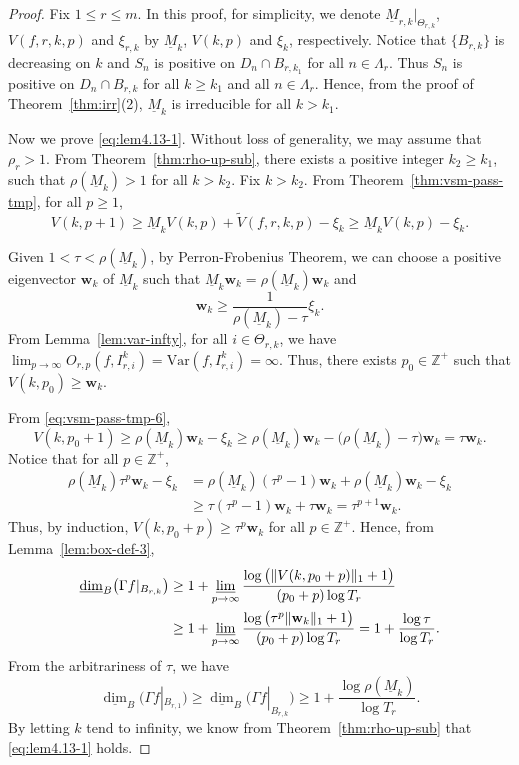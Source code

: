\documentclass[11pt]{amsart}
\theoremstyle{definition}
\theoremstyle{remark}
\numberwithin{equation}{section}
\newcommand{\bfw}{{\mathbf w}}
\newcommand{\lowM}{{\underline{M}}}
\newcommand{\uprho}{{{\rho}}}
\newcommand{\Var}{\mathrm{Var}}
\def\lowdimB{\underline{\dim}_B}
\begin{document}
\begin{proof}
	
	Fix $ 1 \leq r \leq m$.
	In this proof, for simplicity, we denote $\lowM_{r,k}|_{\Theta_{r,k}}$, $V(f,r,k,p)$ and $\xi_{{r,k}}$ by $\lowM_{k}$, $V(k,p)$ and $\xi_{k}$, respectively. 
	Notice that $\{B_{r,k}\}$ is decreasing on $k$ and $S_n$ is positive on $D_n \cap B_{r,k_1}$ for all $n\in \Lambda_r$. Thus $S_n$ is positive on $D_n \cap B_{r,k}$ for all $k\geq k_1$ and all $n\in \Lambda_r$. Hence, from the proof of Theorem~\ref{thm:irr}(2), $\lowM_{k}$ is irreducible for all $k > k_1$. 
	
	Now we prove \eqref{eq:lem4.13-1}. Without loss of generality, we may assume that $\uprho_r>1$. From Theorem~\ref{thm:rho-up-sub}, there exists a positive integer $k_2\geq k_1$, such that $\rho(\lowM_k)>1$ for all $k>k_2$. Fix $k >k_2$. 
	From Theorem~\ref{thm:vsm-pass-tmp}, for all $p\geq 1$,
	\begin{equation}\label{eq:vsm-pass-tmp-6}
		V(k,p+1) \geq \lowM_{k}V(k,p) + \widetilde{V}(f,r,k,p) -\xi_{k}\geq \lowM_{k}V(k,p) -\xi_{k}.
	\end{equation}
	
	
	Given $1 <\tau <\rho(\lowM_k)$,
	by Perron-Frobenius Theorem, we can choose a positive eigenvector $\bfw_{k}$ of $\lowM_{k}$ such that $ \lowM_{k} \bfw_{k}=\rho(\lowM_{k})\bfw_{k}$ and
	$$
	\bfw_{k} \geq \frac{1}{\rho(\lowM_{k})-\tau}\xi_{k}. 
	$$
	From Lemma~\ref{lem:var-infty}, for all $i \in \Theta_{r,k}$, we have $\lim_{p \to \infty}O_{r,p}(f,I_{r,i}^k)=\Var(f,I_{r,i}^k)=\infty$.
	Thus, there exists $p_0\in \mathbb{Z}^+$ such that $V(k, p_0) \geq \bfw_{k}$.
	
	
	From \eqref{eq:vsm-pass-tmp-6}, 
	$$
	V(k, p_0+1)  \geq \rho(\lowM_{k})  \bfw_{k}-\xi_{k}
	\geq \rho(\lowM_{k})  \bfw_{k}-\big(\rho(\lowM_{k})-\tau\big)\bfw_{k} =\tau \bfw_{k}.
	$$
	Notice that for all $p \in \mathbb{Z}^+$,
	\begin{align*}
		\rho(\lowM_{k}) \tau^p \bfw_{k} -\xi_{k} &=\rho(\lowM_{k})(\tau^p-1)\bfw_{k} +\rho(\lowM_{k})\bfw_{k}-\xi_{k} \\
		&\geq \tau (\tau^p-1) \bfw_{k} +\tau \bfw_{k}=\tau^{p+1} \bfw_{k}.
	\end{align*}
	Thus, by induction, $V(k, p_0+p) \geq \tau^p \bfw_k$ for all $p \in \mathbb{Z}^+ $. Hence, from Lemma~\ref{lem:box-def-3}, 
	\begin{align*}
		\lowdimB \big( \Gamma f|_{B_{r,k}}\big) 
		&\geq 1+ \varliminf_{p \to \infty} \frac{\log \big(\lVert V(k,p_0+p) \rVert_1 +1\big)}{(p_{0}+p) \log T_r } \\
		&\geq 1+\varliminf_{p \to \infty} \frac{\log\big(\tau^p \lVert \bfw_{k} \rVert_1 +1\big)}{(p_{0}+p)\log T_r } 
		= 1+ \frac{\log \tau}{ \log T_r } .
	\end{align*}
	From the arbitrariness of $\tau$, we have
	\[
	\lowdimB \big( \Gamma f|_{B_{r,1}}\big) 
	\geq\lowdimB \big( \Gamma f|_{B_{r,k}}\big) 
	\geq 1+ \frac{\log \rho(\lowM_{k})}{ \log T_r }.
	\]
	By letting $k$ tend to infinity, we know from Theorem~\ref{thm:rho-up-sub} that \eqref{eq:lem4.13-1} holds.
\end{proof}
\end{document}

